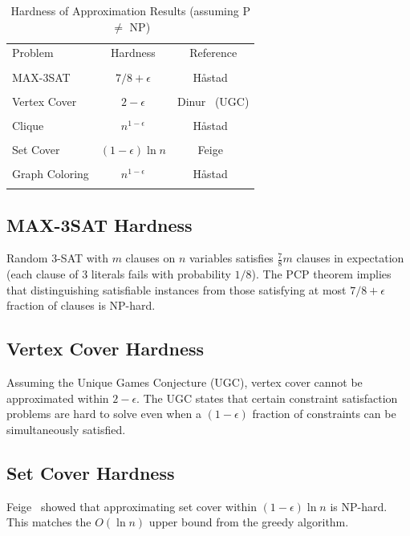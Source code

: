 \begin{table}[H]
\centering
\caption{Hardness of Approximation Results (assuming P $\neq$ NP)}
\begin{tabular}{lcc}
\toprule
Problem & Hardness & Reference \\\\
\midrule
MAX-3SAT & $7/8 + \epsilon$ & H{\aa}stad~\cite{hastad97} \\\\
Vertex Cover & $2 - \epsilon$ & Dinur~\cite{dinur05} (UGC) \\\\
Clique & $n^{1-\epsilon}$ & H{\aa}stad~\cite{hastad99} \\\\
Set Cover & $(1-\epsilon)\ln n$ & Feige~\cite{feige98} \\\\
Graph Coloring & $n^{1-\epsilon}$ & H{\aa}stad~\cite{hastad99} \\\\
\bottomrule
\end{tabular}
\end{table}

\subsection{MAX-3SAT Hardness}
Random 3-SAT with $m$ clauses on $n$ variables satisfies $\frac{7}{8}m$ clauses in expectation (each clause of 3 literals fails with probability $1/8$). The PCP theorem implies that distinguishing satisfiable instances from those satisfying at most $7/8 + \epsilon$ fraction of clauses is NP-hard.

\subsection{Vertex Cover Hardness}
Assuming the Unique Games Conjecture (UGC), vertex cover cannot be approximated within $2 - \epsilon$. The UGC states that certain constraint satisfaction problems are hard to solve even when a $(1-\epsilon)$ fraction of constraints can be simultaneously satisfied.

\subsection{Set Cover Hardness}
Feige~\cite{feige98} showed that approximating set cover within $(1-\epsilon)\ln n$ is NP-hard. This matches the $O(\ln n)$ upper bound from the greedy algorithm.

